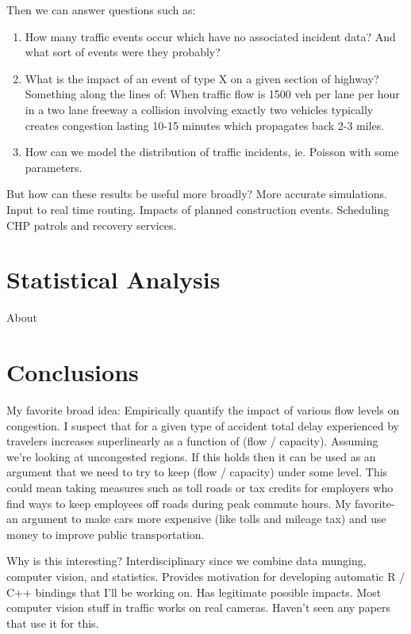 \documentclass[12pt]{article}
\begin{document}
Then we can answer questions such as:
\begin{enumerate}
    \item How many traffic events occur which have no associated incident
        data? And what sort of events were they probably?
    \item What is the impact of an event of type X on a given section of
        highway? Something along the lines of: When traffic flow is 1500
        veh per lane per hour in a two lane freeway a collision involving
        exactly two vehicles typically creates congestion lasting 10-15
        minutes which propagates back 2-3 miles. 
    \item How can we model the distribution of traffic incidents, ie.
        Poisson with some parameters.
\end{enumerate}

But how can these results be useful more broadly? More accurate
simulations. Input to real time routing. Impacts of planned construction
events. Scheduling CHP patrols and recovery services.

\section{Statistical Analysis}

About

\section{Conclusions}


My favorite broad idea: Empirically quantify the impact of various flow levels on congestion.
I suspect that for a given type of accident total delay experienced by
travelers increases superlinearly as a function of (flow / capacity).
Assuming we're looking at uncongested regions. If this holds then it can be
used as an argument that we need to try to keep (flow / capacity) under
some level. This could mean taking measures such as toll roads or tax
credits for employers who find ways to keep employees off roads during peak
commute hours. My favorite- an argument to make cars more expensive (like
tolls and mileage tax) and use money to improve public transportation.

Why is this interesting? Interdisciplinary since we combine data munging,
computer vision, and statistics. Provides motivation for developing
automatic R / C++ bindings that I'll be working on. Has legitimate possible
impacts. Most computer vision stuff in traffic works on real cameras.
Haven't seen any papers that use it for this.

 


\end{document}
